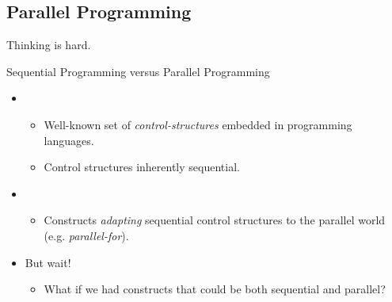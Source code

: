 \subsection{Parallel Programming}

\begin{frame}
\begin{LARGE}
\begin{center}
Thinking  is hard.
\end{center}
\end{LARGE}
\hfill {}
\end{frame}

\begin{frame}[t]{Sequential Programming versus Parallel Programming}
\begin{itemize}
\item {}
  \begin{itemize}
    \item Well-known set of \emph{control-structures} embedded in programming languages.
    \item Control structures inherently sequential.
  \end{itemize}
\vfill\pause
\item {}
  \begin{itemize}
    \item Constructs \emph{adapting} sequential control structures to the parallel world
          (e.g. \emph{parallel-for}).
  \end{itemize}
\vfill\pause
\item But wait!
  \begin{itemize}
    \item What if we had constructs that could be both sequential and parallel?
  \end{itemize}
\end{itemize}
\end{frame}
